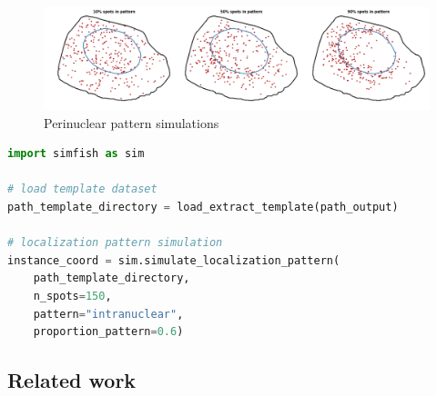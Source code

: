 \begin{figure}[h]
    \centering
    \includegraphics[width=1\textwidth]{figures/chapter4/perinuclear_panel}
    \caption{Perinuclear pattern simulations}
    \label{fig:perinuclear_panel}
\end{figure}

\begin{minipage}{0.9\textwidth}
\begin{lstlisting}[language=Python]
import simfish as sim

# load template dataset
path_template_directory = load_extract_template(path_output)

# localization pattern simulation
instance_coord = sim.simulate_localization_pattern(
	path_template_directory,
	n_spots=150,
	pattern="intranuclear",
	proportion_pattern=0.6)
\end{lstlisting}
\end{minipage}

\subsection{Related work} \label{subsec:related_work_learned_features}






